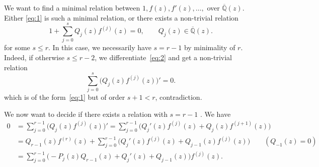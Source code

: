 \documentclass[reqno,english,12pt,a4paper]{smfart}
\numberwithin{equation}{section}
\def\Qbar{\overline{\mathbb Q}}
\begin{document}
We want to find a minimal relation between $1, f(z), f'(z), \ldots,$ over $\Qbar(z)$. Either \eqref{eq:1} is such a 
minimal relation, or there exists a non-trivial relation  
\begin{equation}\label{eq:2}
1+\sum_{j=0}^{s} Q_j(z)f^{(j)}(z)=0, \qquad Q_j(z)\in \Qbar (z).
\end{equation}
for some $s\le r$. In this case, we necessarily have $s=r-1$ by minimality of $r$. Indeed, if 
otherwise $s\le r-2$, we differentiate~\eqref{eq:2} and get a non-trivial relation 
\begin{equation}\label{eq:new4}
\sum_{j=0}^s \big(Q_j(z)f^{(j)}(z)\big) '=0 .
\end{equation}
which is of the form~\eqref{eq:1} but of order $s+1<r$, contradiction.

We now want to decide if there exists a relation with $s=r-1$ . We have
\begin{align*}
0&=\sum_{j=0}^{r-1} \big(Q_j(z)f^{(j)}(z)\big) '
=\sum_{j=0}^{r-1} \big(Q_j'(z)f^{(j)}(z)+Q_j(z)f^{(j+1)}(z)\big)
\\
&=Q_{r-1}(z)f^{(r)}(z)+\sum_{j=0}^{r-1} \big(Q_j'(z)f^{(j)}(z)+Q_{j-1}(z)f^{(j)}(z)\big)  \qquad (Q_{-1}(z)=0)
\\
&=\sum_{j=0}^{r-1}\big(-P_j(z)Q_{r-1}(z) + Q_j'(z)+Q_{j-1}(z)\big) f^{(j)}(z).
\end{align*}
\end{document}
